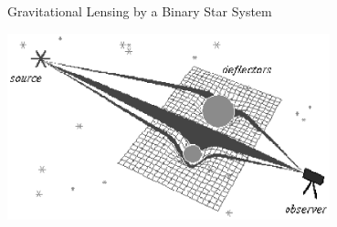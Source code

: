 \documentclass[aspectratio=1610,xcolor=dvipsnames,t]{beamer}
\begin{document}


    \begin{frame}{Gravitational Lensing by a Binary Star System}
        \begin{center}
            \includegraphics[width=0.7\textwidth]{images/lens_model.eps}
        \end{center}
    \end{frame} 


\end{document}
